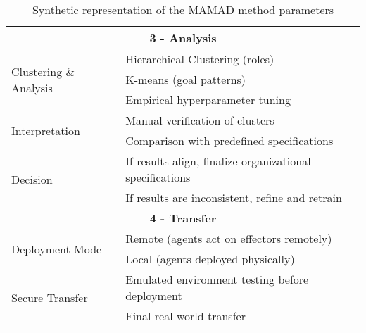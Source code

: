 \begin{table}[h!]
\begin{tabular}{|l|p{10cm}|}
        \multicolumn{2}{|c|}{\textbf{3 - Analysis}} \\ \hline
        \multirow{3}{*}{Clustering \& Analysis} 
            & Hierarchical Clustering (roles) \\ 
            & K-means (goal patterns) \\ 
            & Empirical hyperparameter tuning \\ \hline
        \multirow{2}{*}{Interpretation} 
            & Manual verification of clusters \\ 
            & Comparison with predefined specifications \\ \hline
        \multirow{2}{*}{Decision} 
            & If results align, finalize organizational specifications \\ 
            & If results are inconsistent, refine and retrain \\ \hline

        \multicolumn{2}{|c|}{\textbf{4 - Transfer}} \\ \hline
        \multirow{2}{*}{Deployment Mode} 
            & Remote (agents act on effectors remotely) \\ 
            & Local (agents deployed physically) \\ \hline
        \multirow{2}{*}{Secure Transfer} 
            & Emulated environment testing before deployment \\ 
            & Final real-world transfer \\ \hline
    \end{tabular}
    \caption{Synthetic representation of the MAMAD method parameters}
    \label{tab:mamad_table_configuration}
\end{table}
